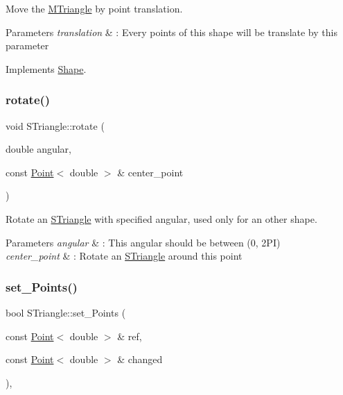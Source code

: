 Move the \hyperlink{classMTriangle}{M\+Triangle} by point translation. 


\begin{DoxyParams}{Parameters}
{\em translation} & \+: Every points of this shape will be translate by this parameter \\
\hline
\end{DoxyParams}


Implements \hyperlink{classShape_a1f447acd6219cb10b9b7a40371519c46}{Shape}.

\mbox{\label{classSTriangle_a53b7f48c2bc66402170912686e77ec5d}} 
\subsubsection{\texorpdfstring{rotate()}{rotate()}}
{\footnotesize\ttfamily void S\+Triangle\+::rotate (\begin{DoxyParamCaption}\item[{double}]{angular,  }\item[{const \hyperlink{classPoint}{Point}$<$ double $>$ \&}]{center\+\_\+point }\end{DoxyParamCaption})}



Rotate an \hyperlink{classSTriangle}{S\+Triangle} with specified angular, used only for an other shape. 


\begin{DoxyParams}{Parameters}
{\em angular} & \+: This angular should be between (0, 2\+PI) \\
\hline
{\em center\+\_\+point} & \+: Rotate an \hyperlink{classSTriangle}{S\+Triangle} around this point \\
\hline
\end{DoxyParams}
\mbox{\label{classSTriangle_acab6926951bd8f2558e4c658610c0e51}} 
\subsubsection{\texorpdfstring{set\+\_\+\+Points()}{set\_Points()}}
{\footnotesize\ttfamily bool S\+Triangle\+::set\+\_\+\+Points (\begin{DoxyParamCaption}\item[{const \hyperlink{classPoint}{Point}$<$ double $>$ \&}]{ref,  }\item[{const \hyperlink{classPoint}{Point}$<$ double $>$ \&}]{changed }\end{DoxyParamCaption})\hspace{0.3cm}{\ttfamily [override]}, {\ttfamily [virtual]}}



